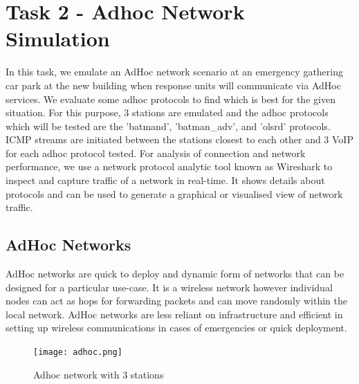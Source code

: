 \documentclass{article}
\begin{document}
\newpage
\section{Task 2 - Adhoc Network Simulation}
In this task, we emulate an AdHoc network scenario at an emergency gathering car park at the new building when response units will communicate via AdHoc services. We evaluate some adhoc protocols to find which is best for the given situation. For this purpose, 3 stations are emulated and the adhoc protocols which will be tested are the 'batmand', 'batman\_adv', and 'olsrd' protocols. ICMP streams are initiated between the stations closest to each other and 3 VoIP for each adhoc protocol tested. For analysis of connection and network performance, we use a network protocol analytic tool known as Wireshark to inspect and capture traffic of a network in real-time. It shows details about protocols and can be used to generate a graphical or visualised view of network traffic.
\subsection{AdHoc Networks}
AdHoc\cite{1010101} networks are quick to deploy and dynamic form of networks that can be designed for a particular use-case. It is a wireless network however individual nodes can act as hops for forwarding packets and can move randomly within the local network. AdHoc networks are less reliant on infrastructure and efficient in setting up wireless communications in cases of emergencies or quick deployment.
    	\begin{figure}[h]
        		\centering
        		\texttt{[image: adhoc.png]}
        		\caption{Adhoc network with 3 stations}
        		\label{fig:t2-1}
    	\end{figure}
\end{document}
